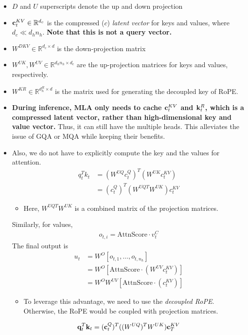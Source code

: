 \begin{itemize}
	\item $D$ and $U$ superscripts denote the up and down projection
	\item ${\mathbf{c}}_t^{KV}\in \mathbb{R}^{d_c}$ is the compressed (\ie $c$) \textit{latent vector} for keys and values, where $d_c\ll d_hn_h$. \textbf{Note that this is not a query vector.}
	\item $W^{DKV}\in \mathbb{R}^{d_c\times d}$ is the down-projection matrix
	\item $W^{UK},W^{UV}\in \mathbb{R}^{d_hn_h\times d_c}$ are the up-projection matrices for keys and values, respectively.
	\item $W^{KR}\in \mathbb{R}^{d_h^R\times d}$ is the matrix used for generating the decoupled key of RoPE. 
	\item \textbf{During inference, MLA only needs to cache ${\mathbf{c}}_t^{KV}$ and ${\mathbf{k}}_t^{R}$, which is a compressed latent vector, rather than high-dimensional key and value vector.} Thus, it can still have the multiple heads. This alleviates the issue of GQA or MQA while keeping their benefits. 
	\item Also, we do not have to explicitly compute the key and the values for attention.
		\begin{align*}
			q_t^Tk_t &= (W^{UQ}c_t^Q)^T(W^{UK}c_t^{KV})\\
					 &= (c_t^Q)^T(W^{UQT}W^{UK})c_t^{KV}
		\end{align*}
		\begin{itemize}
			\item Here, $W^{UQT}W^{UK}$ is a combined matrix of the projection matrices.
		\end{itemize}
		Similarly, for values,
		\begin{align*}
			o_{t,i} = \text{AttnScore}\cdot v_t^C
		\end{align*}
		The final output is
		\begin{align*}
			u_t &= W^O[o_{t,1}, \dots, o_{t,n_h}]\\
				&= W^O[\text{AttnScore}\cdot (W^{UV}c_t^{KV})]\\
				&= W^OW^{UV}[\text{AttnScore}\cdot (c_t^{KV})]
		\end{align*}
		\begin{itemize}
			\item To leverage this advantage, we need to use the \textit{decoupled RoPE}. Otherwise, the RoPE would be coupled with projection matrices.
		\end{itemize}
		\begin{align*}
			{\mathbf{q}}_t^T{\mathbf{k}}_t = ({\mathbf{c}}_t^Q)^T((W^{UQ})^TW^{UK}){\mathbf{c}}_T^{KV}
		\end{align*}
\end{itemize}

